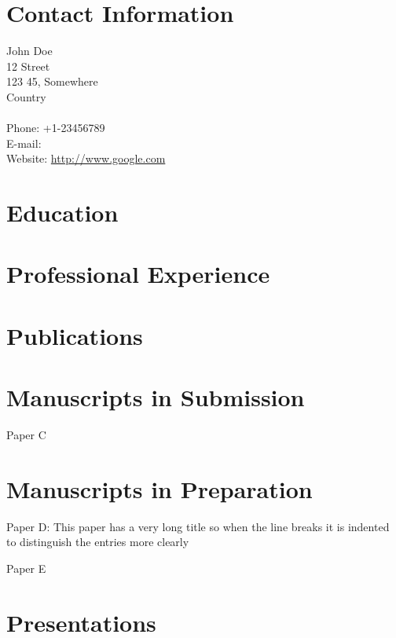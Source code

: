 \documentclass[12pt]{karencv}
\begin{document}
\section{Contact Information}
John Doe\\
12 Street\\
123 45, Somewhere~\\
Country\\~\\
Phone: +1-23456789\\
E-mail: \\
Website: \url{http://www.google.com}


\section{Education}

\section{Professional Experience}

\section{Publications}



\section{Manuscripts in Submission}
Paper C
\section{Manuscripts in Preparation}

\begin{articlelist}
\item Paper D: This paper has a very long title so when the line breaks it is indented to distinguish the entries more clearly
\item Paper E
\end{articlelist}

\section{Presentations}
\end{document}
